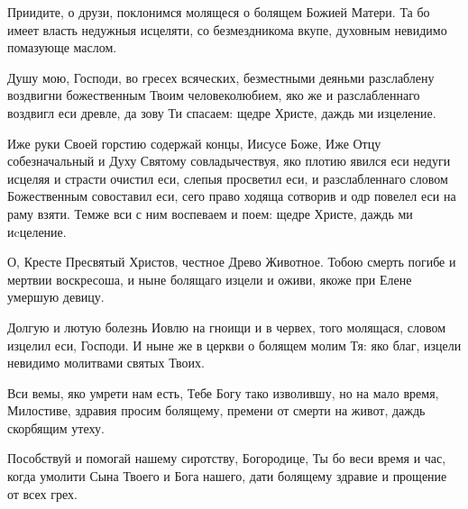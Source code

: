 \begin{mymulticols}
\inyne

Приидите, о друзи, поклонимся молящеся о болящем Божией Матери. Та бо имеет власть недужныя исцеляти, со безмездникома вкупе, духовным невидимо помазующе маслом.




Душу мою, Господи, во гресех всяческих, безместными деяньми разслаблену воздвигни божественным Твоим человеколюбием, яко же и разслабленнаго воздвигл еси древле, да зову Ти спасаем: щедре Христе, даждь ми изцеление.




Иже руки Своей горстию содержай концы, Иисусе Боже, Иже Отцу собезначальный и Духу Святому совладычествуя, яко плотию явился еси недуги исцеляя и страсти очистил еси, слепыя просветил еси, и разслабленнаго словом Божественным совоставил еси, сего право ходяща сотворив и одр повелел еси на раму взяти. Темже вси с ним воспеваем и поем: щедре Христе, даждь ми иcцеление.






О, Кресте Пресвятый Христов, честное Древо Животное. Тобою смерть погибе и мертвии воскресоша, и ныне болящаго изцели и оживи, якоже при Елене умершую девицу.


Долгую и лютую болезнь Иовлю на гноищи и в червех, того молящася, словом изцелил еси, Господи. И ныне же в церкви о болящем молим Тя: яко благ, изцели невидимо молитвами святых Твоих.

\slava

Вси вемы, яко умрети нам есть, Тебе Богу тако изволившу, но на мало время, Милостиве, здравия просим болящему, премени от смерти на живот, даждь скорбящим утеху.

\inyne

Пособствуй и помогай нашему сиротству, Богородице, Ты бо веси время и час, когда умолити Сына Твоего и Бога нашего, дати болящему здравие и прощение от всех грех.






\end{mymulticols}
